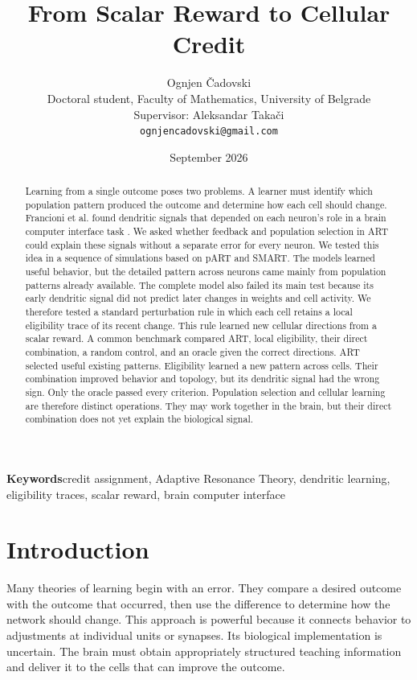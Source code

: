 \documentclass[11pt]{article}
\title{From Scalar Reward to Cellular Credit}
\author{Ognjen \v{C}adovski\\
\small Doctoral student, Faculty of Mathematics, University of Belgrade\\
\small Supervisor: Aleksandar Taka\v{c}i\\
\small \texttt{ognjencadovski@gmail.com}}
\date{September 2026}
\begin{document}
\maketitle

\begin{abstract}
Learning from a single outcome poses two problems. A learner must identify which population pattern produced the outcome and determine how each cell should change. Francioni et al. found dendritic signals that depended on each neuron's role in a brain computer interface task \citep{francioni2026}. We asked whether feedback and population selection in ART could explain these signals without a separate error for every neuron. We tested this idea in a sequence of simulations based on pART and SMART. The models learned useful behavior, but the detailed pattern across neurons came mainly from population patterns already available. The complete model also failed its main test because its early dendritic signal did not predict later changes in weights and cell activity. We therefore tested a standard perturbation rule in which each cell retains a local eligibility trace of its recent change. This rule learned new cellular directions from a scalar reward. A common benchmark compared ART, local eligibility, their direct combination, a random control, and an oracle given the correct directions. ART selected useful existing patterns. Eligibility learned a new pattern across cells. Their combination improved behavior and topology, but its dendritic signal had the wrong sign. Only the oracle passed every criterion. Population selection and cellular learning are therefore distinct operations. They may work together in the brain, but their direct combination does not yet explain the biological signal.
\end{abstract}

\noindent\textbf{Keywords}\quad credit assignment, Adaptive Resonance Theory, dendritic learning, eligibility traces, scalar reward, brain computer interface

\section{Introduction}
Many theories of learning begin with an error. They compare a desired outcome with the outcome that occurred, then use the difference to determine how the network should change. This approach is powerful because it connects behavior to adjustments at individual units or synapses. Its biological implementation is uncertain. The brain must obtain appropriately structured teaching information and deliver it to the cells that can improve the outcome.
\end{document}

